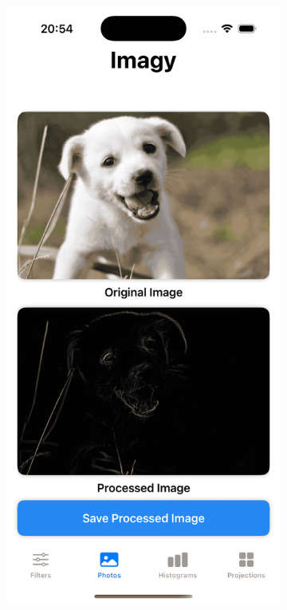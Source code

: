 \documentclass[a4paper]{article}
\begin{document}
\begin{figure}[H]
    \centering
    \begin{subfigure}{0.2\textwidth}
        \centering
        \includegraphics[width=\linewidth]{images/dog_robert_cross.png}

\end{subfigure}
\end{figure}
\end{document}
